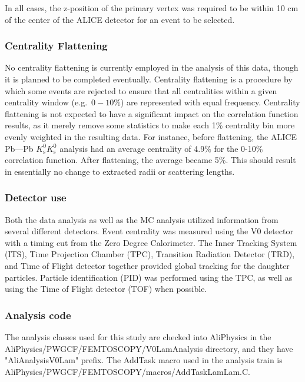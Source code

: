 In all cases, the z-position of the primary vertex was required to be within 10 cm of the center of the ALICE detector for an event to be selected.  

\subsubsection{Centrality Flattening}
\label{sec:CentralityFlattening}

No centrality flattening is currently employed in the analysis of this data, though it is planned to be completed eventually.  
Centrality flattening is a procedure by which some events are rejected to ensure that all centralities within a given centrality window (e.g.\ $0-10\%$) are represented with equal frequency.  
Centrality flattening is not expected to have a significant impact on the correlation function results, as it merely remove some statistics to make each 1\% centrality bin more evenly weighted in the resulting data.  
For instance, before flattening, the ALICE Pb---Pb $K^0_\mathrm{s}K^0_\mathrm{s}$ analysis had an average centrality of 4.9\% for the 0-10\% correlation function.  
After flattening, the average became 5\%.  
This should result in essentially no change to extracted radii or scattering lengths.

\subsubsection{Detector use}
Both the data analysis as well as the MC analysis utilized information from several different detectors.  
Event centrality was measured using the V0 detector with a timing cut from the Zero Degree Calorimeter.  
The Inner Tracking System (ITS), Time Projection Chamber (TPC), Transition Radiation Detector (TRD), and Time of Flight detector together provided global tracking for the daughter particles.  
Particle identification (PID) was performed using the TPC, as well as using the Time of Flight detector (TOF) when possible.

\subsubsection{Analysis code}
The analysis classes used for this study are checked into AliPhysics in the AliPhysics/PWGCF/FEMTOSCOPY/V0LamAnalysis directory, and they have "AliAnalysisV0Lam" prefix.
The AddTask macro used in the analysis train is AliPhysics/PWGCF/FEMTOSCOPY/macros/AddTaskLamLam.C.